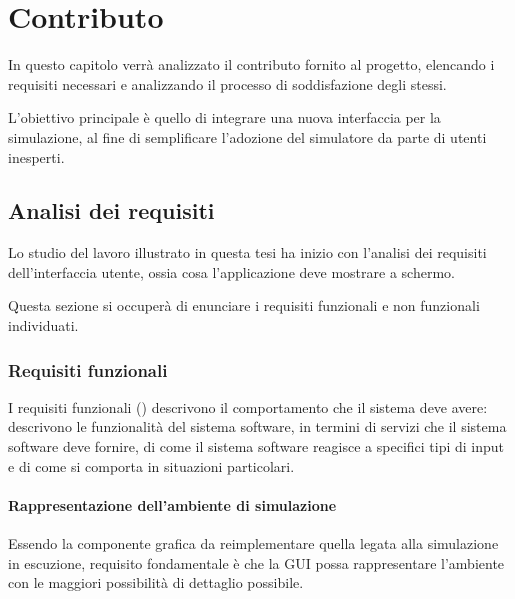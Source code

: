 

\chapter{Contributo}\label{ch:contributo}
    In questo capitolo verrà analizzato il contributo fornito al progetto, elencando i requisiti necessari e analizzando il processo di soddisfazione degli stessi.

    L'obiettivo principale è quello di integrare una nuova interfaccia per la simulazione, al fine di semplificare l’adozione del simulatore da parte di utenti inesperti.

    \section{Analisi dei requisiti}\label{sec:analisi}
        Lo studio del lavoro illustrato in questa tesi ha inizio con l'analisi dei requisiti dell’interfaccia utente, ossia cosa l'applicazione deve mostrare a schermo.

        Questa sezione si occuperà di enunciare i requisiti funzionali e non funzionali individuati.

        \subsection{Requisiti funzionali}\label{sub:funzionali}
            I requisiti funzionali () descrivono il comportamento che il sistema deve avere:
            descrivono le funzionalità del sistema software, in termini di servizi che il sistema software deve fornire, di come il sistema software reagisce a specifici tipi di input e di come si comporta in situazioni particolari.

            \subsubsection{Rappresentazione dell'ambiente di simulazione}\label{subsub:seeEnv}
                Essendo la componente grafica da reimplementare quella legata alla simulazione in escuzione, requisito fondamentale è che la GUI possa rappresentare l'ambiente con le maggiori possibilità di dettaglio possibile.

